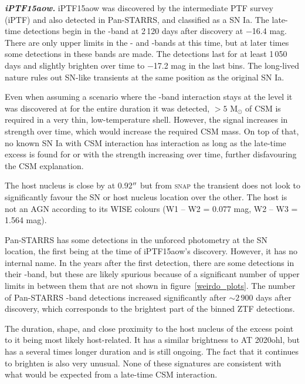 \documentclass[a4paper,oneside,12pt, class=Latex/Classes/PhDthesisPSnPDF, crop=false]{standalone}
\begin{document}
\textit{\textbf{iPTF15aow.}}
iPTF15aow was discovered by the intermediate PTF survey (iPTF) and also detected in Pan-STARRS, and classified as a SN Ia. The late-time detections begin in the \ztfr-band at 2\,120 days after discovery at $-$16.4 mag. There are only upper limits in the \ztfg- and \ztfi-bands at this time, but at later times some detections in these bands are made. The detections last for at least 1\,050 days and slightly brighten over time to $-$17.2 mag in the last bins. The long-lived nature rules out SN-like transients at the same position as the original SN Ia.

Even when assuming a scenario where the \ztfr-band interaction stays at the level it was discovered at for the entire duration it was detected, $> 5$ M$_\odot$ of CSM is required in a very thin, low-temperature shell. However, the signal increases in strength over time, which would increase the required CSM mass. On top of that, no known SN Ia with CSM interaction has interaction as long as the late-time excess is found for or with the strength increasing over time, further disfavouring the CSM explanation.

The host nucleus is close by at 0.92$^{\prime\prime}$ but from \textsc{snap} the transient does not look to significantly favour the SN or host nucleus location over the other. The host is not an AGN according to its WISE colours (W1 -- W2 = 0.077 mag, W2 -- W3 = 1.564 mag).

Pan-STARRS has some detections in the unforced photometry at the SN location, the first being at the time of iPTF15aow's discovery. However, it has no internal name. In the years after the first detection, there are some detections in their \ztfi-band, but these are likely spurious because of a significant number of upper limits in between them that are not shown in figure~\ref{weirdo_plots}. The number of Pan-STARRS \ztfi-band detections increased significantly after $\sim2\,900$ days after discovery, which corresponds to the brightest part of the binned ZTF detections.

The duration, shape, and close proximity to the host nucleus of the excess point to it being most likely host-related. It has a similar brightness to AT 2020ohl, but has a several times longer duration and is still ongoing. The fact that it continues to brighten is also very unusual. None of these signatures are consistent with what would be expected from a late-time CSM interaction.
\end{document}
